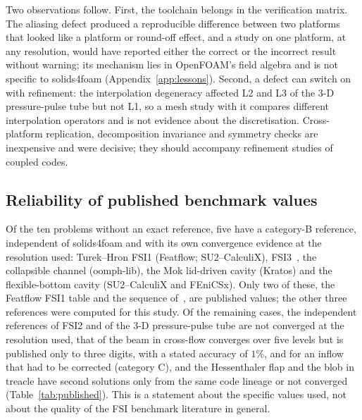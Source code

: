 Two observations follow.
First, the toolchain belongs in the verification matrix.
The aliasing defect produced a reproducible difference between two platforms that looked like a platform or round-off effect, and a study on one platform, at any resolution, would have reported either the correct or the incorrect result without warning; its mechanism lies in OpenFOAM's field algebra and is not specific to solids4foam (Appendix~\ref{app:lessons}).
Second, a defect can switch on with refinement: the interpolation degeneracy affected L2 and L3 of the 3-D pressure-pulse tube but not L1, so a mesh study with it compares different interpolation operators and is not evidence about the discretisation.
Cross-platform replication, decomposition invariance and symmetry checks are inexpensive and were decisive; they should accompany refinement studies of coupled codes.

\subsection{Reliability of published benchmark values}\label{sec:published_reliability}

Of the ten problems without an exact reference, five have a category-B reference, independent of solids4foam and with its own convergence evidence at the resolution used: Turek--Hron FSI1 (Featflow; SU2--CalculiX), FSI3~\citep{Failer2020}, the collapsible channel (oomph-lib), the Mok lid-driven cavity (Kratos) and the flexible-bottom cavity (SU2--CalculiX and FEniCSx).
Only two of these, the Featflow FSI1 table and the sequence of~\citet{Failer2020}, are published values; the other three references were computed for this study.
Of the remaining cases, the independent references of FSI2 and of the 3-D pressure-pulse tube are not converged at the resolution used, that of the beam in cross-flow converges over five levels but is published only to three digits, with a stated accuracy of $1\%$, and for an inflow that had to be corrected (category C), and the Hessenthaler flap and the blob in treacle have second solutions only from the same code lineage or not converged (Table~\ref{tab:published}).
This is a statement about the specific values used, not about the quality of the FSI benchmark literature in general.

